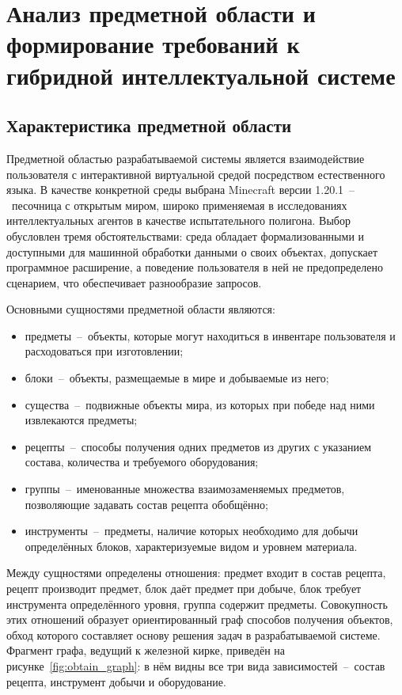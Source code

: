 \section{Анализ предметной области и формирование требований к гибридной интеллектуальной системе}

\subsection{Характеристика предметной области}

Предметной областью разрабатываемой системы является взаимодействие пользователя
с интерактивной виртуальной средой посредством естественного языка. В качестве
конкретной среды выбрана Minecraft версии 1.20.1~--~песочница с открытым миром,
широко применяемая в исследованиях интеллектуальных агентов в качестве
испытательного полигона. Выбор обусловлен тремя
обстоятельствами: среда обладает формализованными и доступными для машинной
обработки данными о своих объектах, допускает программное расширение, а поведение
пользователя в ней не предопределено сценарием, что обеспечивает разнообразие
запросов\cite{Wang2024,Fan2022}.

Основными сущностями предметной области являются:

\begin{itemize}
  \item предметы~--~объекты, которые могут находиться в инвентаре пользователя
        и расходоваться при изготовлении;
  \item блоки~--~объекты, размещаемые в мире и добываемые из него;
  \item существа~--~подвижные объекты мира, из которых при победе над ними
        извлекаются предметы;
  \item рецепты~--~способы получения одних предметов из других с указанием
        состава, количества и требуемого оборудования;
  \item группы~--~именованные множества взаимозаменяемых предметов, позволяющие
        задавать состав рецепта обобщённо;
  \item инструменты~--~предметы, наличие которых необходимо для добычи
        определённых блоков, характеризуемые видом и уровнем материала.
\end{itemize}

Между сущностями определены отношения: предмет входит в состав рецепта, рецепт
производит предмет, блок даёт предмет при добыче, блок требует инструмента
определённого уровня, группа содержит предметы. Совокупность этих отношений
образует ориентированный граф способов получения объектов, обход которого
составляет основу решения задач в разрабатываемой системе. Фрагмент графа, ведущий к
железной кирке, приведён на рисунке~\ref{fig:obtain_graph}: в нём видны все три вида
зависимостей~--~состав рецепта, инструмент добычи и оборудование.

